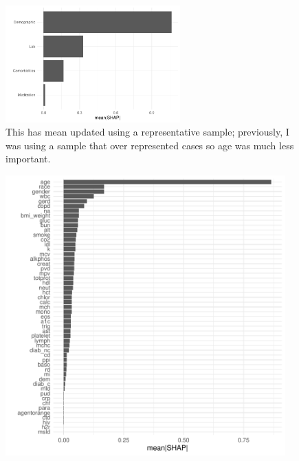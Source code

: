 \documentclass[12pt]{article}
\begin{document}
\begin{figure}[h]
\centering
\includegraphics[width=0.6\textwidth]{figures/shap_new/shap_categories.pdf}
\caption{This has mean updated using a representative sample; previously, I was using a sample that over represented cases
so age was much less important.}
\end{figure}
\begin{figure}[h]
\centering
\includegraphics[width=0.96\textwidth]{figures/shap_new/shap_groups.pdf}
\end{figure}
\end{document}
